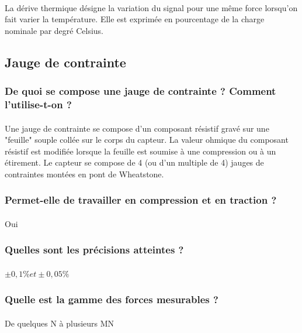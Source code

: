 \documentclass{article}
\begin{document}
\paragraph{}
La dérive thermique désigne la variation du signal pour une même force lorsqu'on fait varier la température. Elle est exprimée en pourcentage de la charge nominale par degré Celsius.

\subsection{Jauge de contrainte}
\subsubsection{De quoi se compose une jauge de contrainte ? Comment l’utilise-t-on ?}
\paragraph{}
Une jauge de contrainte se compose d'un composant résistif gravé sur une "feuille" souple collée sur le corps du capteur. La valeur ohmique du composant résistif est modifiée lorsque la feuille est soumise à une compression ou à un étirement. Le capteur se compose de 4 (ou d'un multiple de 4) jauges de contraintes montées en pont de Wheatstone.

\subsubsection{Permet-elle de travailler en compression et en traction ?}
\paragraph{}
Oui

\subsubsection{Quelles sont les précisions atteintes ?}
\paragraph{}
$\pm0,1\% et \pm0,05\%$


\subsubsection{Quelle est la gamme des forces mesurables ?}
\paragraph{}
De quelques N à plusieurs MN
\end{document}
